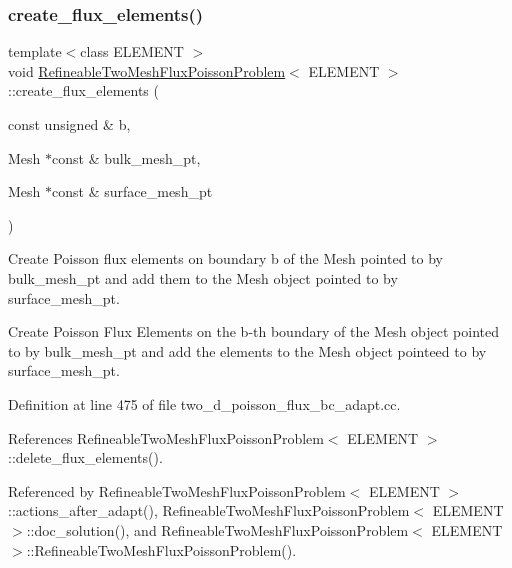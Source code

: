 \subsubsection{\texorpdfstring{create\+\_\+flux\+\_\+elements()}{create\_flux\_elements()}}
{\footnotesize\ttfamily template$<$class E\+L\+E\+M\+E\+NT $>$ \\
void \hyperlink{classRefineableTwoMeshFluxPoissonProblem}{Refineable\+Two\+Mesh\+Flux\+Poisson\+Problem}$<$ E\+L\+E\+M\+E\+NT $>$\+::create\+\_\+flux\+\_\+elements (\begin{DoxyParamCaption}\item[{const unsigned \&}]{b,  }\item[{Mesh $\ast$const \&}]{bulk\+\_\+mesh\+\_\+pt,  }\item[{Mesh $\ast$const \&}]{surface\+\_\+mesh\+\_\+pt }\end{DoxyParamCaption})\hspace{0.3cm}{\ttfamily [private]}}



Create Poisson flux elements on boundary b of the Mesh pointed to by bulk\+\_\+mesh\+\_\+pt and add them to the Mesh object pointed to by surface\+\_\+mesh\+\_\+pt. 

Create Poisson Flux Elements on the b-\/th boundary of the Mesh object pointed to by bulk\+\_\+mesh\+\_\+pt and add the elements to the Mesh object pointeed to by surface\+\_\+mesh\+\_\+pt. 

Definition at line 475 of file two\+\_\+d\+\_\+poisson\+\_\+flux\+\_\+bc\+\_\+adapt.\+cc.



References Refineable\+Two\+Mesh\+Flux\+Poisson\+Problem$<$ E\+L\+E\+M\+E\+N\+T $>$\+::delete\+\_\+flux\+\_\+elements().



Referenced by Refineable\+Two\+Mesh\+Flux\+Poisson\+Problem$<$ E\+L\+E\+M\+E\+N\+T $>$\+::actions\+\_\+after\+\_\+adapt(), Refineable\+Two\+Mesh\+Flux\+Poisson\+Problem$<$ E\+L\+E\+M\+E\+N\+T $>$\+::doc\+\_\+solution(), and Refineable\+Two\+Mesh\+Flux\+Poisson\+Problem$<$ E\+L\+E\+M\+E\+N\+T $>$\+::\+Refineable\+Two\+Mesh\+Flux\+Poisson\+Problem().

\mbox{\label{classRefineableTwoMeshFluxPoissonProblem_ab35087cadc6dbc7a602441b9a986d650}} 
